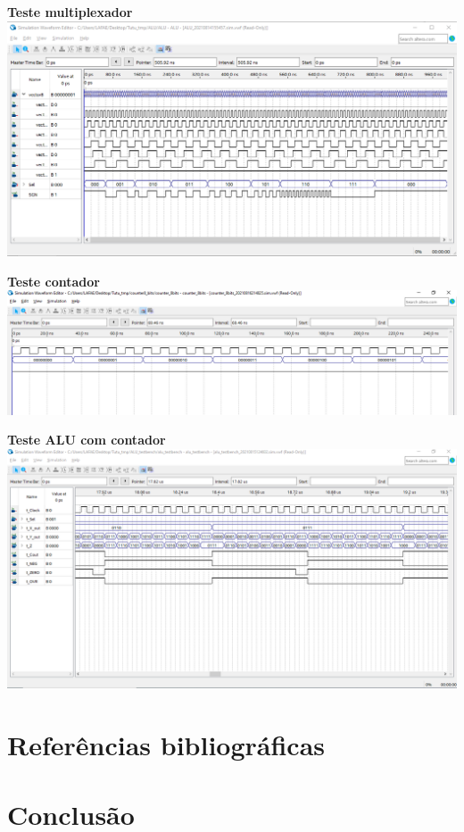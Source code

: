 \documentclass{article}
\begin{document}
\begin{center}

\textbf{Teste multiplexador}
\includegraphics[width=\textwidth]{img/teste_mux.png}

\textbf{Teste contador}
\includegraphics[width=\textwidth]{img/teste_contador.png}

\textbf{Teste ALU com contador}
\includegraphics[width=\textwidth]{img/teste_alu_com_contador.png}
\end{center}

\section{Referências bibliográficas}


\section{Conclusão}
\end{document}
